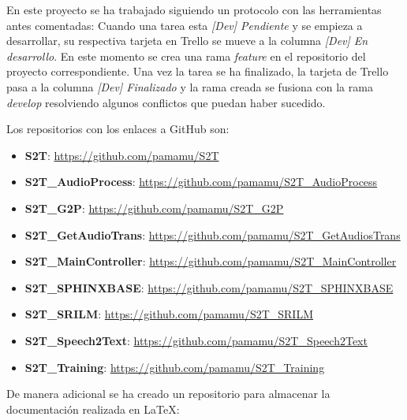 \documentclass[../main.tex]{subfiles}
\begin{document}
En este proyecto se ha trabajado siguiendo un protocolo con las herramientas antes comentadas: Cuando una tarea esta \textit{[Dev] Pendiente} y se empieza a desarrollar, su respectiva tarjeta en Trello se mueve a la columna \textit{[Dev] En desarrollo}. En este momento se crea una rama \textit{feature} en el repositorio del proyecto correspondiente. Una vez la tarea se ha finalizado, la tarjeta de Trello pasa a la columna \textit{[Dev] Finalizado} y la rama creada se fusiona con la rama \textit{develop} resolviendo algunos conflictos que puedan haber sucedido.

Los repositorios con los enlaces a GitHub son:
\begin{itemize}
    \item \textbf{S2T}: \href{https://github.com/pamamu/S2T}{https://github.com/pamamu/S2T}
    \item \textbf{S2T\_AudioProcess}: \href{https://github.com/pamamu/S2T_AudioProcess}{https://github.com/pamamu/S2T\_AudioProcess}
    \item \textbf{S2T\_G2P}: \href{https://github.com/pamamu/S2T_G2P}{https://github.com/pamamu/S2T\_G2P}
    \item \textbf{S2T\_GetAudioTrans}: \href{https://github.com/pamamu/S2T_GetAudiosTrans}{https://github.com/pamamu/S2T\_GetAudiosTrans}
    \item \textbf{S2T\_MainController}: \href{https://github.com/pamamu/S2T_MainController}{https://github.com/pamamu/S2T\_MainController}
    \item \textbf{S2T\_SPHINXBASE}: \href{https://github.com/pamamu/S2T_SPHINXBASE}{https://github.com/pamamu/S2T\_SPHINXBASE}
    \item \textbf{S2T\_SRILM}: \href{https://github.com/pamamu/S2T_SRILM}{https://github.com/pamamu/S2T\_SRILM}
    \item \textbf{S2T\_Speech2Text}: \href{https://github.com/pamamu/S2T_Speech2Text}{https://github.com/pamamu/S2T\_Speech2Text}
    \item \textbf{S2T\_Training}: \href{https://github.com/pamamu/S2T_Training}{https://github.com/pamamu/S2T\_Training}
\end{itemize}

De manera adicional se ha creado un repositorio para almacenar la documentación realizada en \LaTeX: 
\end{document}
